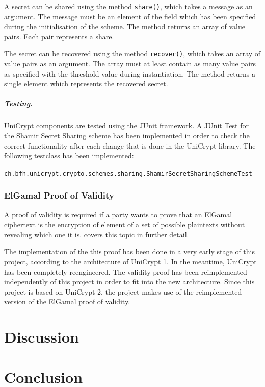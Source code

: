 \documentclass[numbers=noenddot, abstract=on, a4paper, headsepline,
footsepline, oneside, draft=off]{scrreprt}
\begin{document}
A secret can be shared using the method \texttt{share()}, which takes
a message as an argument. The message must be an element of the field which has
been specified during the initialisation of the scheme. The method returns an
array of value pairs. Each pair represents a share.

The secret can be recovered using the method \texttt{recover()}, which takes an
array of value pairs as an argument. The array must at least contain as many
value pairs as specified with the threshold value during instantiation. The
method returns a single element which represents the recovered secret.

\paragraph{Testing.}
UniCrypt components are tested using the JUnit framework. A JUnit Test for the
Shamir Secret Sharing scheme has been implemented in order to check the correct
functionality after each change that is done in the UniCrypt library. The
following testclass has been implemented:

\texttt{ch.bfh.unicrypt.crypto.schemes.sharing.ShamirSecretSharingSchemeTest}

\subsection{ElGamal Proof of Validity}
A proof of validity is required if a party wants to prove that an ElGamal
ciphertext is the encryption of element of a set of possible plaintexts without
revealing which one it is.  covers this topic in
further detail.

The implementation of the this proof has been done in a very early stage of this
project, according to the architecture of UniCrypt 1. In the meantime, UniCrypt
has been completely reengineered. The validity proof has been reimplemented
independently of this project in order to fit into the new architecture. Since
this project is based on UniCrypt 2, the project makes use of the reimplemented
version of the ElGamal proof of validity.


\chapter{Discussion}
\label{cha:discussion}

\chapter{Conclusion}
\label{cha:conclusion}
\end{document}
